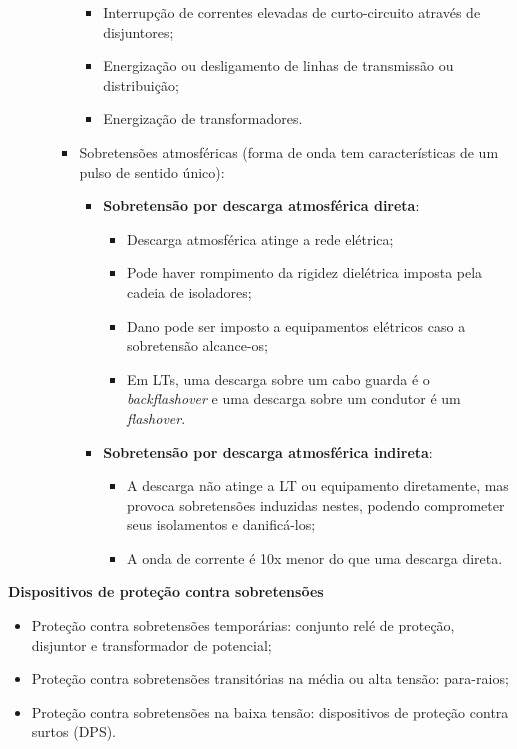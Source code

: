 \begin{itemize}
\begin{itemize}
\begin{itemize}
\begin{itemize}
                \item Interrupção de correntes elevadas de curto-circuito através de disjuntores;
                \item Energização ou desligamento de linhas de transmissão ou distribuição;
                \item Energização de transformadores.
            \end{itemize}
            \item Sobretensões atmosféricas (forma de onda tem características de um pulso de sentido único):
            \begin{itemize}
                \item \textbf{Sobretensão por descarga atmosférica direta}:
                \begin{itemize}
                    \item Descarga atmosférica atinge a rede elétrica;
                    \item Pode haver rompimento da rigidez dielétrica imposta pela cadeia de isoladores;
                    \item Dano pode ser imposto a equipamentos elétricos caso a sobretensão alcance-os;
                    \item Em LTs, uma descarga sobre um cabo guarda é o \textit{backflashover} e uma descarga sobre um condutor é um \textit{flashover}.
                \end{itemize}
                \item \textbf{Sobretensão por descarga atmosférica indireta}:
                \begin{itemize}
                    \item A descarga não atinge a LT ou equipamento diretamente, mas provoca sobretensões induzidas nestes, podendo comprometer seus isolamentos e danificá-los;
                    \item A onda de corrente é 10x menor do que uma descarga direta.
                \end{itemize}
            \end{itemize}
        \end{itemize}
    \end{itemize}
\end{itemize}

\textbf{Dispositivos de proteção contra sobretensões}

\begin{itemize}
    \item Proteção contra sobretensões temporárias: conjunto relé de proteção, disjuntor e transformador de potencial;
    \item Proteção contra sobretensões transitórias na média ou alta tensão: para-raios;
    \item Proteção contra sobretensões na baixa tensão: dispositivos de proteção contra surtos (DPS).
\end{itemize}

